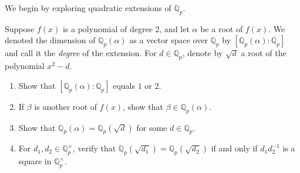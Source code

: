 \documentclass[12 pt, letterpaper]{hmcpset}
\begin{document}
We begin by exploring quadratic extensions of $\mathbb{Q}_{p}$.

\begin{problem}[(1)]
	Suppose $f(x)$ is a polynomial of degree $2$, and let $\alpha$ be a root of $f(x)$. We denoted the dimension of $\mathbb{Q}_{p}(\alpha)$ as a vector space over $\mathbb{Q}_{p}$ by $[\mathbb{Q}_{p}(\alpha) : \mathbb{Q}_{p}]$ and call it the \emph{degree} of the extension. For $d \in \mathbb{Q}_{p}$, denote by $\sqrt{d}$ a root of the polynomial $x^{2} - d$.
	\begin{enumerate}
		\item Show that $[\mathbb{Q}_{p}(\alpha) : \mathbb{Q}_{p}]$ equals $1$ or $2$.
		\item If $\beta$ is another root of $f(x)$, show that $\beta \in \mathbb{Q}_{p}(\alpha)$.
		\item Show that $\mathbb{Q}_{p}(\alpha) = \mathbb{Q}_{p}(\sqrt{d})$ for some $d \in \mathbb{Q}_{p}$.
		\item For $d_{1}, d_{2} \in \mathbb{Q}_{p}^{\times}$, verify that $\mathbb{Q}_{p}(\sqrt{d_{1}}) = \mathbb{Q}_{p}(\sqrt{d_{2}})$ if and only if $d_{1} d_{2}^{-1}$ is a square in $\mathbb{Q}_{p}^{\times}$.
	\end{enumerate}
\end{problem}
\end{document}
